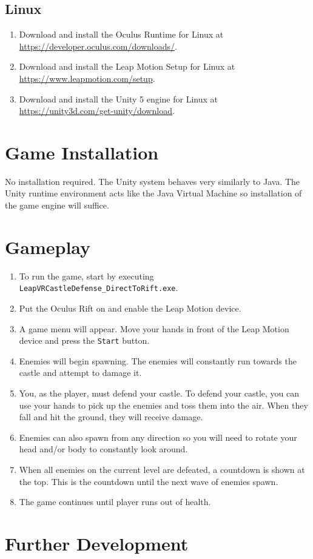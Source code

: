 \documentclass[a4paper]{refart}
\begin{document}
\subsection{Linux}

\begin{enumerate}
	\item Download and install the Oculus Runtime for Linux at\\ \url{https://developer.oculus.com/downloads/}.
	\item Download and install the Leap Motion Setup for Linux at\\ \url{https://www.leapmotion.com/setup}.
	\item Download and install the Unity 5 engine for Linux at\\ \url{https://unity3d.com/get-unity/download}.
\end{enumerate}

\pagebreak

\section{Game Installation}

No installation required. The Unity system behaves very similarly to Java. The Unity runtime environment acts like the Java Virtual Machine so installation of the game engine will suffice.

\section{Gameplay}

\begin{enumerate}
	\item To run the game, start by executing \texttt{LeapVRCastleDefense\_DirectToRift.exe}.
	\item Put the Oculus Rift on and enable the Leap Motion device.
	\item A game menu will appear. Move your hands in front of the Leap Motion device and press the \texttt{Start} button.
	\item Enemies will begin spawning. The enemies will constantly run towards the castle and attempt to damage it. 
	\item You, as the player, must defend your castle. To defend your castle, you can use your hands to pick up the enemies and toss them into the air. When they fall and hit the ground, they will receive damage. 
	\item Enemies can also spawn from any direction so you will need to rotate your head and/or body to constantly look around.
	\item When all enemies on the current level are defeated, a countdown is shown at the top. This is the countdown until the next wave of enemies spawn. 
	\item The game continues until player runs out of health.
\end{enumerate}

\section{Further Development}
\end{document}
